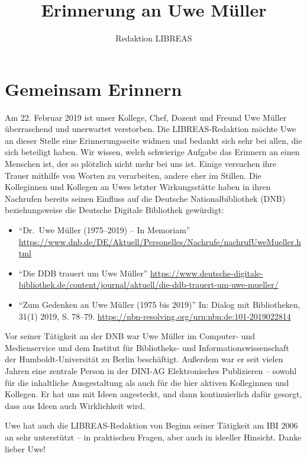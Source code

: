 \documentclass[a4paper,
fontsize=11pt,
oneside,
numbers=noperiodatend,
parskip=half-,
bibliography=totoc,
final
]{scrartcl}
\title{\LARGE{Erinnerung an Uwe Müller}} %
\author{Redaktion LIBREAS} %
\date{}
\begin{document}
\maketitle
\thispagestyle{fancyplain} 


\hypertarget{gemeinsam-erinnern}{%
\section{Gemeinsam Erinnern}\label{gemeinsam-erinnern}}

Am 22. Februar 2019 ist unser Kollege, Chef, Dozent und Freund Uwe
Müller überraschend und unerwartet verstorben. Die LIBREAS-Redaktion
möchte Uwe an dieser Stelle eine Erinnerungsseite widmen und bedankt
sich sehr bei allen, die sich beteiligt haben. Wir wissen, welch
schwierige Aufgabe das Erinnern an einen Menschen ist, der so plötzlich
nicht mehr bei uns ist. Einige versuchen ihre Trauer mithilfe von Worten
zu verarbeiten, andere eher im Stillen. Die Kolleginnen und Kollegen an
Uwes letzter Wirkungsstätte haben in ihren Nachrufen bereits seinen
Einfluss auf die Deutsche Nationalbibliothek (DNB) beziehungsweise die
Deutsche Digitale Bibliothek gewürdigt:

\begin{itemize}
\item
  \enquote{Dr.~Uwe Müller (1975--2019) -- In Memoriam}
  \url{https://www.dnb.de/DE/Aktuell/Personelles/Nachrufe/nachrufUweMueller.html}
\item
  \enquote{Die DDB trauert um Uwe Müller}
  \url{https://www.deutsche-digitale-bibliothek.de/content/journal/aktuell/die-ddb-trauert-um-uwe-mueller/}
\item
  \enquote{Zum Gedenken an Uwe Müller (1975 bis 2019)} In: Dialog mit
  Bibliotheken, 31(1) 2019, S. 78--79.
  \url{https://nbn-resolving.org/urn:nbn:de:101-2019022814}
\end{itemize}

Vor seiner Tätigkeit an der DNB war Uwe Müller im Computer- und
Medienservice und dem Institut für Bibliotheks- und
Informationswissenschaft der Humboldt-Universität zu Berlin beschäftigt.
Außerdem war er seit vielen Jahren eine zentrale Person in der DINI-AG
Elektronisches Publizieren -- sowohl für die inhaltliche Ausgestaltung
als auch für die hier aktiven Kolleginnen und Kollegen. Er hat uns mit
Ideen angesteckt, und dann kontinuierlich dafür gesorgt, dass aus Ideen
auch Wirklichkeit wird.

Uwe hat auch die LIBREAS-Redaktion von Beginn seiner Tätigkeit am IBI
2006 an sehr unterstützt -- in praktischen Fragen, aber auch in ideeller
Hinsicht. Danke lieber Uwe!
\end{document}
